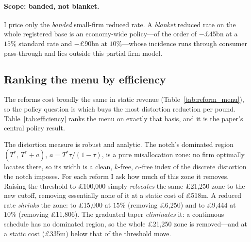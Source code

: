 \paragraph{Scope: banded, not blanket.} I price only the \emph{banded}
small-firm reduced rate. A \emph{blanket} reduced rate on the whole registered
base is an economy-wide policy---of the order of \(-\)\pounds45bn at a $15\%$
standard rate and \(-\)\pounds90bn at $10\%$---whose incidence runs through
consumer pass-through and lies outside this partial firm model.

\subsection{Ranking the menu by efficiency}
\label{sec:results_efficiency}

The reforms cost broadly the same in static revenue (Table~\ref{tab:reform_menu}),
so the policy question is which buys the most distortion reduction per pound.
Table~\ref{tab:efficiency} ranks the menu on exactly that basis, and it is the
paper's central policy result.

The distortion measure is robust and analytic. The notch's dominated region
$(T^{*},\,T^{*}+a)$, $a=T^{*}\tau/(1-\tau)$, is a pure misallocation zone: no firm
optimally locates there, so its width is a clean, $k$-free,
$\alpha$-free index of the discrete distortion the notch imposes. For each reform
I ask how much of this zone it removes. Raising the threshold to \pounds100{,}000
simply \emph{relocates} the same \pounds21{,}250 zone to the new cutoff, removing
essentially none of it at a static cost of \pounds518m. A reduced rate
\emph{shrinks} the zone: to \pounds15{,}000 at $15\%$ (removing \pounds6{,}250)
and to \pounds9{,}444 at $10\%$ (removing \pounds11{,}806). The graduated taper
\emph{eliminates} it: a continuous schedule has no dominated region, so the whole
\pounds21{,}250 zone is removed---and at a static cost (\pounds335m) below that of
the threshold move.

